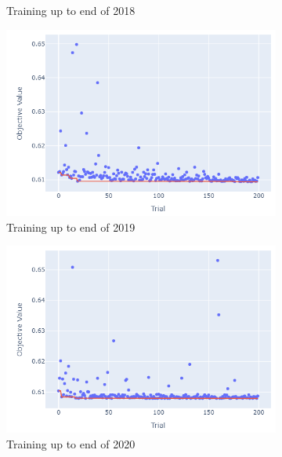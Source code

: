 \documentclass[12pt,twoside]{report}
\begin{document}
\begin{figure}[htb]
\begin{subfigure}{.33\linewidth}
  \caption{Training up to end of 2018}
\end{subfigure}
\par\bigskip
\par\bigskip
\begin{subfigure}{.33\linewidth}
  \centering
  \includegraphics[width=0.95\linewidth]{figures/lr_cutoff_2019.png}
  \caption{Training up to end of 2019}
\end{subfigure}%
\begin{subfigure}{.33\linewidth}
  \centering
  \includegraphics[width=0.95\linewidth]{figures/lr_cutoff_2020.png}
  \caption{Training up to end of 2020}
\end{subfigure}%
\begin{subfigure}{.33\linewidth}
  \centering

\end{subfigure}
\end{figure}
\end{document}
